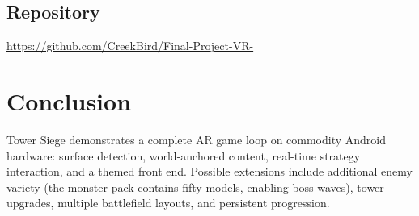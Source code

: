 \documentclass[11pt,a4paper]{article}
\begin{document}
\subsection*{Repository}
\url{https://github.com/CreekBird/Final-Project-VR-}

\section{Conclusion}
Tower Siege demonstrates a complete AR game loop on commodity Android hardware: surface detection, world-anchored content, real-time strategy interaction, and a themed front end. Possible extensions include additional enemy variety (the monster pack contains fifty models, enabling boss waves), tower upgrades, multiple battlefield layouts, and persistent progression.
\end{document}
